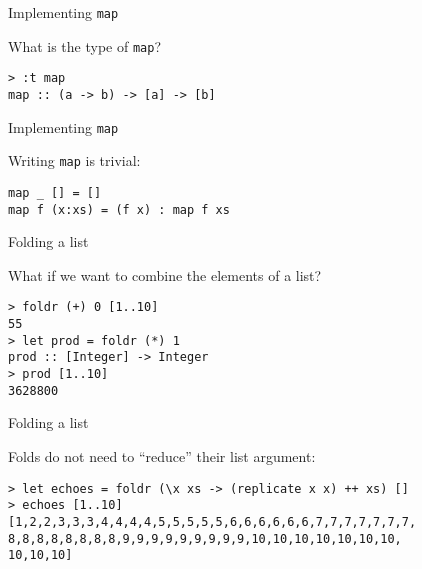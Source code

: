 %
\begin{frame}[fragile]{Implementing \texttt{map}}

What is the type of \texttt{map}?

\begin{block}{}
\begin{verbatim}
> :t map
map :: (a -> b) -> [a] -> [b]
\end{verbatim}
\end{block}

\end{frame}

%
\begin{frame}[fragile]{Implementing \texttt{map}}

Writing \texttt{map} is trivial:

\begin{block}{}
\begin{verbatim}
map _ [] = []
map f (x:xs) = (f x) : map f xs
\end{verbatim}
\end{block}

\end{frame}

%
\begin{frame}[fragile]{Folding a list}

What if we want to combine the elements of a list?

\begin{block}{}
\begin{verbatim}
> foldr (+) 0 [1..10]
55
> let prod = foldr (*) 1
prod :: [Integer] -> Integer
> prod [1..10]
3628800
\end{verbatim}
\end{block}

\end{frame}

%
\begin{frame}[fragile]{Folding a list}

Folds do not need to ``reduce'' their list argument:

\begin{block}{}
\begin{verbatim}
> let echoes = foldr (\x xs -> (replicate x x) ++ xs) []
> echoes [1..10]
[1,2,2,3,3,3,4,4,4,4,5,5,5,5,5,6,6,6,6,6,6,7,7,7,7,7,7,7,
8,8,8,8,8,8,8,8,9,9,9,9,9,9,9,9,9,10,10,10,10,10,10,10,
10,10,10]
\end{verbatim}
\end{block}

\end{frame}

